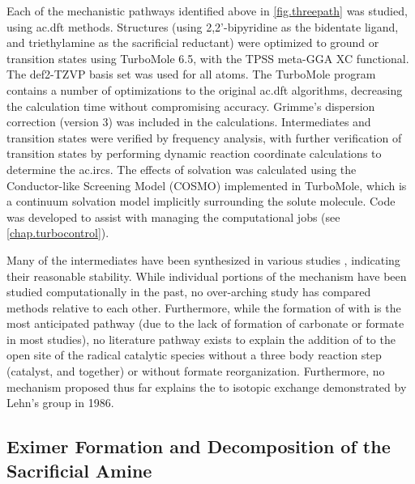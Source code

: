 Each of the mechanistic pathways identified above in \autoref{fig.threepath} was studied, using \gls{ac.dft} methods. Structures (using 2,2'-bipyridine as the bidentate ligand, and triethylamine as the sacrificial reductant) were optimized to ground or transition states using TurboMole 6.5\autocite{turbomole, ahlrichs1989}, with the TPSS meta-GGA XC functional\autocite{tao2003}. The def2-TZVP basis set was used for all atoms\autocite{schafer1994, weigend2005}. The TurboMole program contains a number of optimizations to the original \gls{ac.dft} algorithms\autocite{haase1993, treutler1995, eichkorn1997, eichkorn1995, sierka2003, deglmann2004, weigend2002, vonarnim1998, ahlrichs2004}, decreasing the calculation time without compromising accuracy. Grimme's dispersion correction (version 3) was included in the calculations\autocite{grimme2010}. Intermediates and transition states were verified by frequency analysis\autocite{deglmann2004, deglmann2002, grimme2002}, with further verification of transition states by performing dynamic reaction coordinate calculations to determine the \glspl{ac.irc}. The effects of solvation was calculated using the Conductor-like Screening Model (COSMO) implemented in TurboMole\autocite{klamt1993}, which is a continuum solvation model implicitly surrounding the solute molecule. Code was developed to assist with managing the computational jobs (see \autoref{chap.turbocontrol}).

Many of the intermediates have been synthesized in various studies , indicating their reasonable stability. While individual portions of the mechanism have been studied computationally in the past, no over-arching study has compared methods relative to each other. Furthermore, while the formation of  with  is the most anticipated pathway (due to the lack of formation of carbonate or formate in most studies), no literature pathway exists to explain the addition of  to the open site of the radical catalytic species without a three body reaction step (catalyst,  and  together) or without formate reorganization. Furthermore, no mechanism proposed thus far explains the  to  isotopic exchange demonstrated by Lehn's group in 1986\autocite{hawecker1986}. 

\subsection{Eximer Formation and Decomposition of the Sacrificial Amine}\label{ss.initiation}

